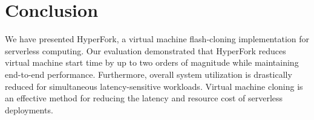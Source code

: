 \section{Conclusion}

We have presented HyperFork, a virtual machine flash-cloning implementation for
serverless computing. Our evaluation demonstrated that HyperFork reduces
virtual machine start time by up to two orders of magnitude while maintaining
end-to-end performance. Furthermore, overall system utilization is drastically
reduced for simultaneous latency-sensitive workloads. Virtual machine cloning
is an effective method for reducing the latency and resource cost of serverless
deployments.
